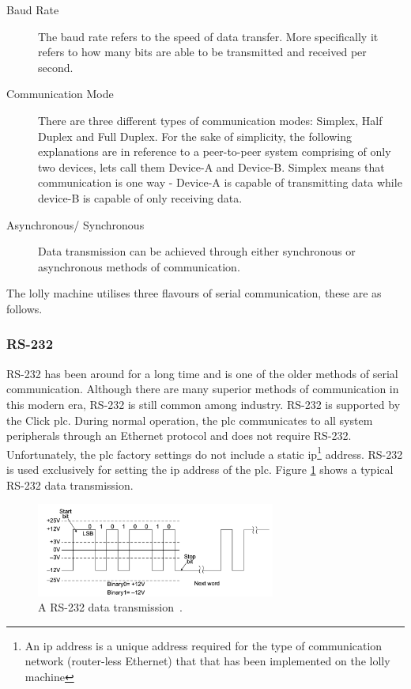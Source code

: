     \begin{description}
    
    \item[Baud Rate] The baud rate refers to the speed of data transfer. More specifically it refers to how many bits are able to be transmitted and received per second. 
    
    \item[Communication Mode] There are three different types of communication modes: Simplex, Half Duplex and Full Duplex. For the sake of simplicity, the following explanations are in reference to a peer-to-peer system comprising of only two devices, lets call them Device-A and Device-B. Simplex means that communication is one way - Device-A is capable of transmitting data while device-B is capable of only receiving data.
    
    \item[Asynchronous/ Synchronous] Data transmission can be achieved through either synchronous or asynchronous methods of communication. 
    
    \end{description}
    
    The lolly machine utilises three flavours of serial communication, these are as follows.
    
    \subsubsection{RS-232}
    RS-232 has been around for a long time and is one of the older methods of serial communication. Although there are many superior methods of communication in this modern era, RS-232 is still common among industry. 
    RS-232 is supported by the Click \acrshort{plc}. During normal operation, the \acrshort{plc} communicates to all system peripherals through an Ethernet protocol and does not require RS-232. Unfortunately, the \acrshort{plc} factory settings do not include a static \acrshort{ip}\footnote{An \acrshort{ip} address is a unique address required for the type of communication network (router-less Ethernet) that that has been implemented on the lolly machine} address.  RS-232 is used exclusively for setting the \acrshort{ip} address of the \acrshort{plc}. Figure \ref{fig:rs232Trans} shows a typical RS-232 data transmission. 

    \begin{figure}[H]
        \centering
        \includegraphics[width = 0.7\textwidth]{2_images/rs232Trans.png}
        \caption{A RS-232 data transmission~\cite{frenzel2015handbook}.}
        \label{fig:rs232Trans}
    \end{figure} 
    \newpage    
    
